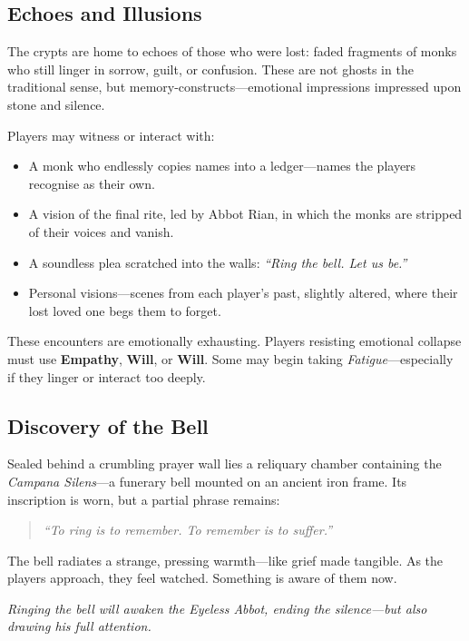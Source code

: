 \documentclass[nodeprecatedcode,bg=print]{dndbook/dndbook}
\begin{document}
\subsection{Echoes and Illusions}

The crypts are home to echoes of those who were lost: faded fragments of monks who still linger in sorrow, guilt, or confusion. These are not ghosts in the traditional sense, but memory-constructs—emotional impressions impressed upon stone and silence.

Players may witness or interact with:
\begin{itemize}
    \item A monk who endlessly copies names into a ledger—names the players recognise as their own.
    \item A vision of the final rite, led by Abbot Rian, in which the monks are stripped of their voices and vanish.
    \item A soundless plea scratched into the walls: \emph{“Ring the bell. Let us be.”}
    \item Personal visions—scenes from each player’s past, slightly altered, where their lost loved one begs them to forget.
\end{itemize}

These encounters are emotionally exhausting. Players resisting emotional collapse must use \textbf{Empathy}, \textbf{Will}, or \textbf{Will}. Some may begin taking \emph{Fatigue}—especially if they linger or interact too deeply.

\subsection{Discovery of the Bell}

Sealed behind a crumbling prayer wall lies a reliquary chamber containing the \emph{Campana Silens}—a funerary bell mounted on an ancient iron frame. Its inscription is worn, but a partial phrase remains:

\begin{quote}
\textit{“To ring is to remember. To remember is to suffer.”}
\end{quote}

The bell radiates a strange, pressing warmth—like grief made tangible. As the players approach, they feel watched. Something is aware of them now.

\emph{Ringing the bell will awaken the Eyeless Abbot, ending the silence—but also drawing his full attention.}
\end{document}

